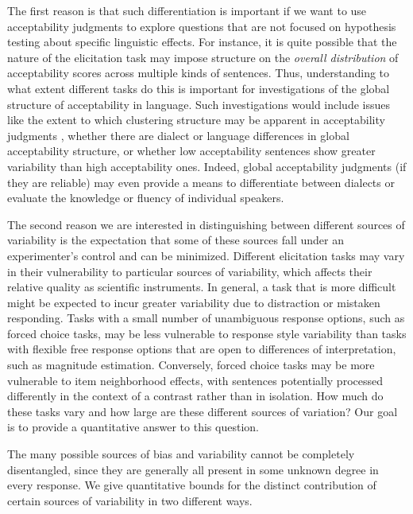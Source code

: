 \documentclass[doc]{apa6}
\begin{document}
The first reason is that such differentiation is important if we want to use acceptability judgments to explore questions that are not focused on hypothesis testing about specific linguistic effects. For instance, it is quite possible that the nature of the elicitation task may impose structure on the {\it overall distribution} of acceptability scores across multiple kinds of sentences. Thus, understanding to what extent different tasks do this is important for investigations of the global structure of acceptability in language. Such investigations would include issues like the extent to which clustering structure may be apparent in acceptability judgments \citep{lau2016lingprobview,hofmeister2013grammarvsprocessing}, whether there are dialect or language differences in global acceptability structure, or whether low acceptability sentences show greater variability than high acceptability ones. Indeed, global acceptability judgments (if they are reliable) may even provide a means to differentiate between dialects or evaluate the knowledge or fluency of individual speakers.

The second reason we are interested in distinguishing between different sources of variability is the expectation that some of these sources fall under an experimenter's control and can be minimized. Different elicitation tasks may vary in their vulnerability to particular sources of variability, which affects their relative quality as scientific instruments. In general, a task that is more difficult might be expected to incur greater variability due to distraction or mistaken responding. Tasks with a small number of unambiguous response options, such as forced choice tasks, may be less vulnerable to response style variability than tasks with flexible free response options that are open to differences of interpretation, such as magnitude estimation. Conversely, forced choice tasks may be more vulnerable to item neighborhood effects, with sentences potentially processed differently in the context of a contrast rather than in isolation. How much do these tasks vary and how large are these different sources of variation? Our goal is to provide a quantitative answer to this question.

The many possible sources of bias and variability cannot be completely disentangled, since they are generally all present in some unknown degree in every response. We give quantitative bounds for the distinct contribution of certain sources of variability in two different ways.
\end{document}
